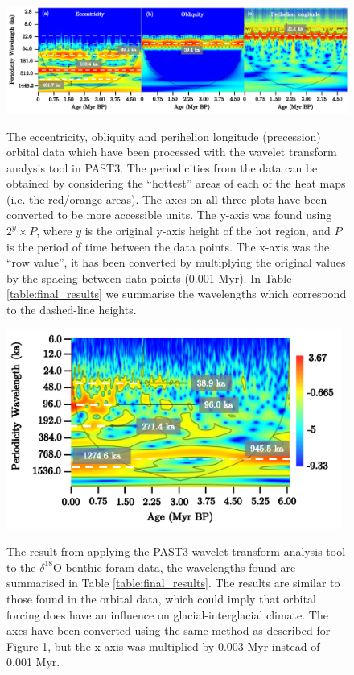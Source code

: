 \documentclass[12pt, onecolumn]{revtex4}    %
\begin{document}
\begin{figure}[!h]
\begin{center}
\includegraphics[width=16.2cm]{figures/wa_orbital_data}
\caption[]{The eccentricity, obliquity and perihelion longitude (precession) orbital data which have been processed with the wavelet transform analysis tool in PAST3. The periodicities from the data can be obtained by considering the ``hottest'' areas of each of the heat maps (i.e. the red/orange areas). The axes on all three plots have been converted to be more accessible units. The y-axis was found using $2^y \times P$, where $y$ is the original y-axis height of the hot region, and $P$ is the period of time between the data points. The x-axis was the ``row value'', it has been converted by multiplying the original values by the spacing between data points (0.001 Myr). In Table \ref{table:final_results} we summarise the wavelengths which correspond to the dashed-line heights.}
\vspace{-3ex}
\label{fig:wa_orbital_data}
\end{center}
\end{figure}

\begin{figure}[!h]
\begin{center}
\includegraphics[width=11cm]{figures/wa_d18O.pdf}
\caption[]{The result from applying the PAST3 wavelet transform analysis tool to the $\delta^{18}$O benthic foram data, the wavelengths found are summarised in Table \ref{table:final_results}. The results are similar to those found in the orbital data, which could imply that orbital forcing does have an influence on glacial-interglacial climate. The axes have been converted using the same method as described for Figure \ref{fig:wa_orbital_data}, but the x-axis was multiplied by 0.003 Myr instead of 0.001 Myr. }
\vspace{-3ex}
\label{fig:wa_d18o}
\end{center}
\end{figure}
\end{document}
